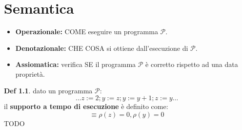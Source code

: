 \documentclass[a4paper]{report}
\newcommand{\prop}{\mathcal{P}}
\theoremstyle{definition} \newtheorem*{defi}{Def}
\theoremstyle{plain} \newtheorem{lemma}{Lemma}
\theoremstyle{plain} \newtheorem{teo}{Teorema}
\theoremstyle{remark} \newtheorem*{es}{Esempio}
\begin{document}
\chapter{Semantica}
\begin{itemize}
	\item {\bf Operazionale:} COME eseguire un programma $\prop$.
	\item {\bf Denotazionale:} CHE COSA si ottiene dall'esecuzione di $\prop$.
	\item {\bf Assiomatica:} verifica SE il programma $\prop$ è corretto rispetto ad una data proprietà.
\end{itemize}
\begin{defi} dato un programma $\prop$:
	\begin{equation}
		{\ldots}z:=2; y:=z; y:=y+1; z:=y{\ldots}
	\end{equation}
	il {\bf supporto a tempo di esecuzione} è definito come:
	\begin{equation}
		[z=0, y=0] \equiv \rho(z) = 0, \rho(y) = 0
	\end{equation}
	TODO
\end{defi}
\end{document}
